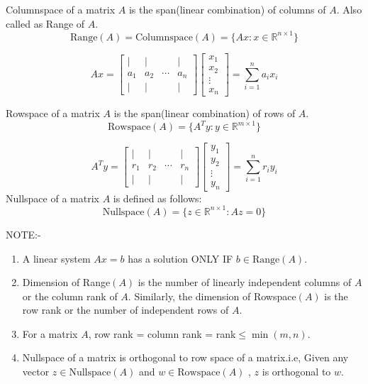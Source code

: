 \documentclass[
]{book}
\begin{document}
Columnspace of a matrix \(A\) is the span(linear combination) of columns of \(A\). Also called as Range of \(A\).
\begin{equation}
\text{Range}(A) =\text{Columnspace}(A) =  \{ Ax : x\in \mathbb{R}^{n\times 1} \}
\end{equation}

\[Ax = \begin{bmatrix} | & | &  & | \\ a_1 & a_2 &\cdots & a_n \\ | & | & & |\end{bmatrix}\begin{bmatrix}x_1\\x_2\\ \vdots\\ x_n \end{bmatrix} = \sum_{i=1}^n a_i x_i\]

Rowspace of a matrix \(A\) is the span(linear combination) of rows of \(A\).
\begin{equation}
\text{Rowspace}(A) = \{ A^Ty : y\in \mathbb{R}^{m\times 1} \} 
\end{equation}

\[A^Ty = \begin{bmatrix} | & | &  & | \\ r_1 & r_2 &\cdots & r_n \\ | & | & & |\end{bmatrix}\begin{bmatrix}y_1\\y_2\\ \vdots\\ y_n \end{bmatrix} = \sum_{i=1}^n r_i y_i\]
Nullspace of a matrix \(A\) is defined as follows:
\begin{equation}
\text{Nullspace}(A) = \{ z\in \mathbb{R}^{n\times 1}: Az=0\}
\end{equation}

NOTE:-

\begin{enumerate}
\def\labelenumi{\arabic{enumi}.}
\item
  A linear system \(Ax=b\) has a solution ONLY IF \(b\in\text{Range}(A)\).
\item
  Dimension of Range\((A)\) is the number of linearly independent columns of \(A\) or the column rank of \(A\). Similarly, the dimension of Rowspace\((A)\) is the row rank or the number of independent rows of \(A\).
\item
  For a matrix \(A\), row rank = column rank = rank\(\le \min(m,n)\).
\item
  Nullspace of a matrix is orthogonal to row space of a matrix.i.e, Given any vector \(z\in \text{Nullspace}(A)\) and \(w \in \text{Rowspace}(A)\) , \(z\) is orthogonal to \(w\).
\end{enumerate}
\end{document}
